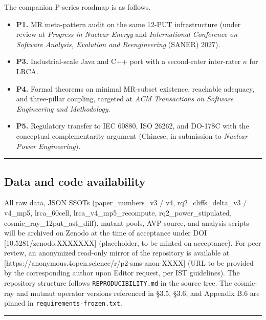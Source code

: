\documentclass[review,12pt,authoryear]{elsarticle}
\providecommand{\tightlist}{\setlength{\itemsep}{0pt}\setlength{\parskip}{0pt}}
\begin{document}
The companion P-series roadmap is as follows.

\begin{itemize}
\tightlist
\item
  \textbf{P1.} MR meta-pattern audit on the same 12-PUT infrastructure
  (under review at \emph{Progress in Nuclear Energy} and
  \emph{International Conference on Software Analysis, Evolution and
  Reengineering} (SANER) 2027).
\item
  \textbf{P3.} Industrial-scale Java and C++ port with a second-rater
  inter-rater $\kappa$ for LRCA.
\item
  \textbf{P4.} Formal theorems on minimal MR-subset existence, reachable
  adequacy, and three-pillar coupling, targeted at \emph{ACM
  Transactions on Software Engineering and Methodology}.
\item
  \textbf{P5.} Regulatory transfer to IEC 60880, ISO 26262, and DO-178C
  with the conceptual complementarity argument (Chinese, in submission
  to \emph{Nuclear Power Engineering}).
\end{itemize}

\begin{center}\rule{0.5\linewidth}{0.5pt}\end{center}

\subsection{Data and code
availability}\label{data-and-code-availability}

All raw data, JSON SSOTs (paper\_numbers\_v3 / v4,
rq2\_cliffs\_delta\_v3 / v4\_mp5, lrca\_60cell,
lrca\_v4\_mp5\_recompute, rq2\_power\_stipulated,
cosmic\_ray\_12put\_ast\_diff), mutant pools, AVP source, and analysis
scripts will be archived on Zenodo at the time of acceptance under DOI
{[}10.5281/zenodo.XXXXXXX{]} (placeholder, to be minted on acceptance).
For peer review, an anonymized read-only mirror of the repository is
available at {[}https://anonymous.4open.science/r/p2-sms-anon-XXXX{]}
(URL to be provided by the corresponding author upon Editor request, per
IST guidelines). The repository structure follows
\texttt{REPRODUCIBILITY.md} in the source tree. The cosmic-ray and
mutmut operator versions referenced in §3.5, §3.6, and Appendix B.6 are
pinned in \texttt{requirements-frozen.txt}.

\begin{center}\rule{0.5\linewidth}{0.5pt}\end{center}
\end{document}
